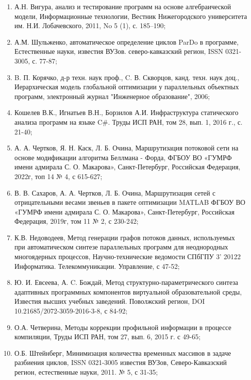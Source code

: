 \begin{enumerate}
    \item А.Н. Вигура, анализ и тестирование программ на основе алгебраической модели, Информационные технологии, Вестник Нижегородского университета им. Н.И. Лобачевского, 2011, No 5 (1), с. 185–190;
    \item А.М. Шульженко, автоматическое определение циклов ParDo в программе, Естественные науки, известия ВУЗов. северо-кавказский регион, ISSN 0321-3005, с. 77-87;
    \item B. П. Корячко, д-р техн. наук проф., C. В. Скворцов, канд. техн. наук доц., Иерархическая модель глобальной оптимизации у параллельных объектных программ, электронный журнал "Инженерное образование", 2006; 
    \item Кошелев В.К., Игнатьев В.Н., Борзилов А.И. Инфраструктура статического анализа программ на языке C\#. Труды ИСП РАН, том 28, вып. 1, 2016 г., с. 21-40;
    \item А. А. Чертков, Я. Н. Каск, Л. Б. Очина, Маршрутизация потоковой сети на основе модификации алгоритма Беллмана - Форда, ФГБОУ ВО «ГУМРФ имени адмирала С. О. Макарова», Санкт-Петербург, Российская Федерация, 2022г, топ 14 № 4, с 615-627;
    \item В. В. Сахаров, А. А. Чертков, Л. Б. Очина, Маршрутизация сетей с отрицательными весами звеньев в пакете оптимизации MATLAB ФГБОУ ВО «ГУМРФ имени адмирала С. О. Макарова», Санкт-Петербург, Российская Федерация, 2019г, том 11 № 2, с 230-242;
    \item К.В. Недоводеев, Метод генерации графов потоков данных, используемых при автоматическом синтезе параллельных программ для неоднородных многоядерных процессов, Научно-технические ведомости СПбГПУ 3' 20122 Информатика. Телекоммуникации. Управление, с 47-52;
    \item Ю. И. Евсеева, А. C. Бождай, Метод структурно-параметрического синтеза адаптивных программных компонентов виртуальной образовательной среды, Известия высших учебных заведений. Поволжский регион, DOI 10.21685/2072-3059-2016-3-8, с 84-92;
    \item О.А. Четверина, Методы коррекции профильной информации в процессе компиляции, Труды ИСП РАН, том 27, вып. 6, 2015 г. с 49-65;
    \item О.Б. Штейнберг, Минимизация количества временных массивов в задаче разбиения циклов, ISSN 0321-3005 известия ВУЗов, Северо-Кавказский регион, естественные науки, 2011. № 5, с 31-35;

\end{enumerate}
